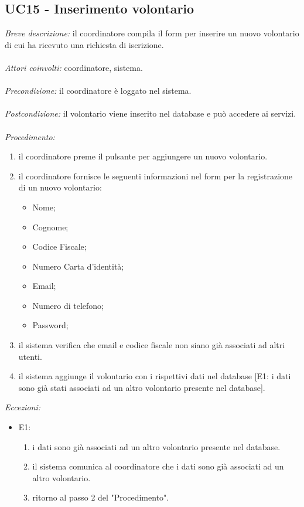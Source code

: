 \subsection{UC15 - Inserimento volontario}
\textit{Breve descrizione:} il coordinatore compila il form per inserire un nuovo volontario di cui ha ricevuto una richiesta di iscrizione. 
\\
\\
\textit{Attori coinvolti:} coordinatore, sistema.
\\
\\
\textit{Precondizione:} il coordinatore è loggato nel sistema.
\\
\\
\textit{Postcondizione:} il volontario viene inserito nel database e può accedere ai servizi.
\\
\\
\textit{Procedimento:}
\begin{enumerate}
	\item il coordinatore preme il pulsante per aggiungere un nuovo volontario.
	\item il coordinatore fornisce le seguenti informazioni nel form per la registrazione di un nuovo volontario:
	\begin{itemize}
		\item Nome;
		\item Cognome;
		\item Codice Fiscale;
		\item Numero Carta d'identità;
		\item Email;
		\item Numero di telefono;
		\item Password;
	\end{itemize}
	\item il sistema verifica che email e codice fiscale non siano già associati ad altri utenti.
	\item il sistema aggiunge il volontario con i rispettivi dati nel database [E1: i dati sono già stati associati ad un altro volontario presente nel database].
\end{enumerate}


\textit{Eccezioni:}
\begin{itemize}
	\item E1:
	\begin{enumerate}
		\item i dati sono già associati ad un altro volontario presente nel database.
		\item il sistema comunica al coordinatore che i dati sono già associati ad un altro volontario.
		\item ritorno al passo 2 del "Procedimento".
	\end{enumerate}
\end{itemize}

